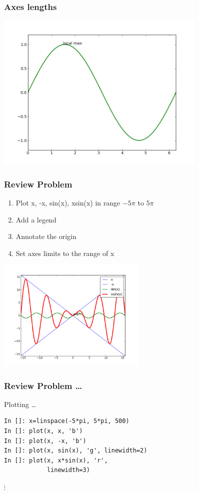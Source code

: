 \documentclass[14pt,compress]{beamer}
\begin{document}
\begin{frame}[fragile]
  \frametitle{Axes lengths}
  \begin{center}
    \includegraphics[height=3in, interpolate=true]{data/limits}
  \end{center}
\end{frame}

\begin{frame}[fragile]
\frametitle{Review Problem}
\begin{enumerate}
\item Plot x, -x, sin(x), xsin(x) in range $-5\pi$ to $5\pi$
\item Add a legend
\item Annotate the origin
\item Set axes limits to the range of x
\end{enumerate}
\vspace*{-0.1in}
\begin{center}
  \includegraphics[height=2.1in, interpolate=true]{data/four_plot}  
\end{center}
\end{frame}

\begin{frame}[fragile]
\frametitle{Review Problem \ldots}
\alert{Plotting \ldots}
\begin{lstlisting}
In []: x=linspace(-5*pi, 5*pi, 500)
In []: plot(x, x, 'b')
In []: plot(x, -x, 'b')
In []: plot(x, sin(x), 'g', linewidth=2)
In []: plot(x, x*sin(x), 'r', 
            linewidth=3)
\end{lstlisting}
$\vdots$
\end{frame}
\end{document}
